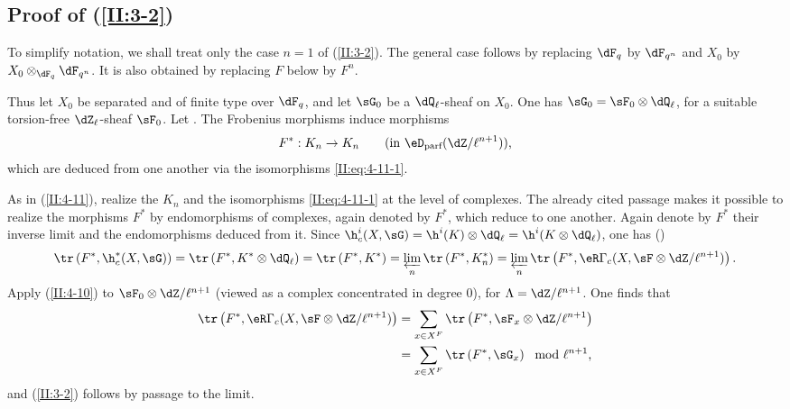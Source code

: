 \subsection{Proof of \texorpdfstring{(\ref{II:3-2})}{(3.2)}}\label{II:4-13}

To simplify notation, we shall treat only the case $n=1$ of
(\ref{II:3-2}). The general case follows by replacing $\dF_q$ by $\dF_{q^n}$ and $X_0$ by $X_0\otimes_{\dF_q}\dF_{q^n}$. It is also obtained by replacing $F$ below by $F^n$.

Thus let $X_0$ be separated and of finite type over $\dF_q$, and let $\sG_0$
be a $\dQ_\ell$-sheaf on $X_0$. One has
$\sG_0=\sF_0\otimes\dQ_\ell$, for a suitable torsion-free
$\dZ_\ell$-sheaf $\sF_0$. Let
. The Frobenius morphisms induce
morphisms
\[
  F^* : K_n\to K_n \qquad \text{(in $\eD_\text{parf}(\dZ/\ell^{n+1})$),}
\]
which are deduced from one another via the isomorphisms
\eqref{II:eq:4-11-1}.

As in (\ref{II:4-11}), realize the $K_n$ and the isomorphisms
\eqref{II:eq:4-11-1} at the level of complexes. The already cited passage
\cite[XV.3.3]{sga5} makes it possible to realize the morphisms $F^*$ by
endomorphisms of complexes, again denoted by $F^*$, which reduce to one
another. Again denote by $F^*$ their inverse limit and the endomorphisms
deduced from it. Since
$\h_c^i(X,\sG) = \h^i(K)\otimes\dQ_\ell = \h^i(K\otimes\dQ_\ell)$, one has
()
\[
  \tr\left(F^*, \h_c^*(X,\sG)\right) = \tr\left(F^*,K^*\otimes\dQ_\ell\right) = \tr\left(F^*,K^*\right) = \varprojlim_n \tr\left(F^*,K_n^*\right) = \varprojlim_n \tr\left(F^*,\eR\Gamma_c(X,\sF\otimes\dZ/\ell^{n+1})\right) \text{.}
\]
Apply (\ref{II:4-10}) to $\sF_0\otimes\dZ/\ell^{n+1}$ (viewed as a complex
concentrated in degree $0$), for $\Lambda=\dZ/\ell^{n+1}$. One finds that
\begin{align*}
  \tr\left(F^*,\eR\Gamma_c(X,\sF\otimes\dZ/\ell^{n+1})\right)
    &= \sum_{x\in X^F} \tr\left(F^*,\sF_x\otimes\dZ/\ell^{n+1}\right) \\
    &= \sum_{x\in X^F} \tr\left(F^*,\sG_x\right) \mod \ell^{n+1} \text{,}
\end{align*}
and (\ref{II:3-2}) follows by passage to the limit.











